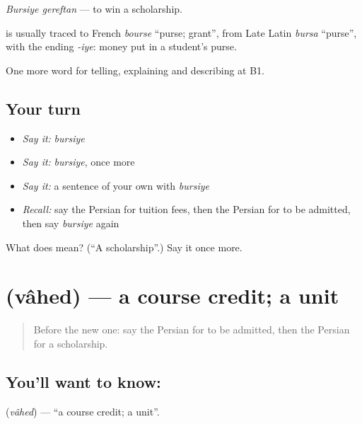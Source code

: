 \emph{Bursiye gereftan} — to win a scholarship.

\begin{cousinweb}
\textbf{} is usually traced to French \emph{bourse} \textquotedblleft{}purse; grant\textquotedblright{}, from Late Latin \emph{bursa} \textquotedblleft{}purse\textquotedblright{}, with the ending \emph{-iye}: money put in a student's purse.
\end{cousinweb}

\begin{grammarlens}[title={What you've built}]
One more word for telling, explaining and describing at B1.
\end{grammarlens}

\subsection*{Your turn}
\begin{itemize}
\raggedright
  \item \emph{Say it:} \emph{bursiye}
  \item \emph{Say it:} \emph{bursiye}, once more
  \item \emph{Say it:} a sentence of your own with \emph{bursiye}
  \item \emph{Recall:} say the Persian for tuition fees, then the Persian for to be admitted, then say \emph{bursiye} again
\end{itemize}

\begin{tcolorbox}[breakable,colback=teal!4,colframe=teal!35!black,title={Before you move on}]
What does  mean? (\textquotedblleft{}A scholarship\textquotedblright{}.) Say it once more.
\end{tcolorbox}
\section[\texorpdfstring{\fa{واحد} (vâhed)}{واحد (vâhed)}]{ (vâhed) — a course credit; a unit}

\label{lesson:FA-C400-vahed}



\begin{quote}
Before the new one: say the Persian for to be admitted, then the Persian for a scholarship.
\end{quote}

\subsection*{You'll want to know: }
\textbf{} (\emph{vâhed}) — \textquotedblleft{}a course credit; a unit\textquotedblright{}.

